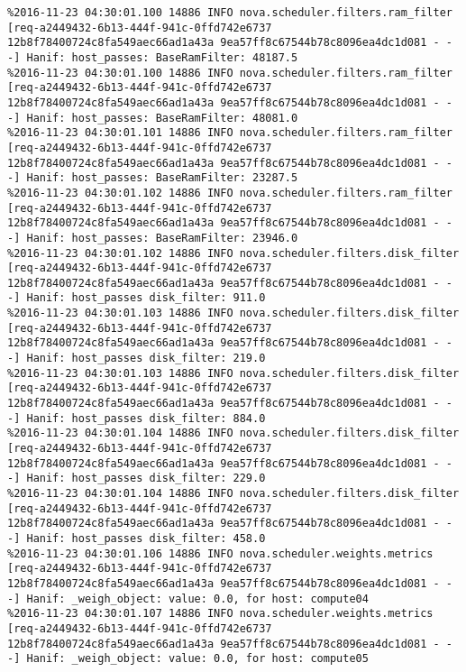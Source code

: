 \begin{lstlisting}[frame=single, caption={The filter scheduler log trace for 10 virtual instances}, label={lst:filterschedulercodetracelog10vi}, escapechar=|]
%2016-11-23 04:30:01.099 14886 INFO nova.scheduler.filters.ram_filter [req-a2449432-6b13-444f-941c-0ffd742e6737 12b8f78400724c8fa549aec66ad1a43a 9ea57ff8c67544b78c8096ea4dc1d081 - - -] Hanif: host_passes: BaseRamFilter: 11598.0
%2016-11-23 04:30:01.100 14886 INFO nova.scheduler.filters.ram_filter [req-a2449432-6b13-444f-941c-0ffd742e6737 12b8f78400724c8fa549aec66ad1a43a 9ea57ff8c67544b78c8096ea4dc1d081 - - -] Hanif: host_passes: BaseRamFilter: 48187.5
%2016-11-23 04:30:01.100 14886 INFO nova.scheduler.filters.ram_filter [req-a2449432-6b13-444f-941c-0ffd742e6737 12b8f78400724c8fa549aec66ad1a43a 9ea57ff8c67544b78c8096ea4dc1d081 - - -] Hanif: host_passes: BaseRamFilter: 48081.0
%2016-11-23 04:30:01.101 14886 INFO nova.scheduler.filters.ram_filter [req-a2449432-6b13-444f-941c-0ffd742e6737 12b8f78400724c8fa549aec66ad1a43a 9ea57ff8c67544b78c8096ea4dc1d081 - - -] Hanif: host_passes: BaseRamFilter: 23287.5
%2016-11-23 04:30:01.102 14886 INFO nova.scheduler.filters.ram_filter [req-a2449432-6b13-444f-941c-0ffd742e6737 12b8f78400724c8fa549aec66ad1a43a 9ea57ff8c67544b78c8096ea4dc1d081 - - -] Hanif: host_passes: BaseRamFilter: 23946.0
%2016-11-23 04:30:01.102 14886 INFO nova.scheduler.filters.disk_filter [req-a2449432-6b13-444f-941c-0ffd742e6737 12b8f78400724c8fa549aec66ad1a43a 9ea57ff8c67544b78c8096ea4dc1d081 - - -] Hanif: host_passes disk_filter: 911.0
%2016-11-23 04:30:01.103 14886 INFO nova.scheduler.filters.disk_filter [req-a2449432-6b13-444f-941c-0ffd742e6737 12b8f78400724c8fa549aec66ad1a43a 9ea57ff8c67544b78c8096ea4dc1d081 - - -] Hanif: host_passes disk_filter: 219.0
%2016-11-23 04:30:01.103 14886 INFO nova.scheduler.filters.disk_filter [req-a2449432-6b13-444f-941c-0ffd742e6737 12b8f78400724c8fa549aec66ad1a43a 9ea57ff8c67544b78c8096ea4dc1d081 - - -] Hanif: host_passes disk_filter: 884.0
%2016-11-23 04:30:01.104 14886 INFO nova.scheduler.filters.disk_filter [req-a2449432-6b13-444f-941c-0ffd742e6737 12b8f78400724c8fa549aec66ad1a43a 9ea57ff8c67544b78c8096ea4dc1d081 - - -] Hanif: host_passes disk_filter: 229.0
%2016-11-23 04:30:01.104 14886 INFO nova.scheduler.filters.disk_filter [req-a2449432-6b13-444f-941c-0ffd742e6737 12b8f78400724c8fa549aec66ad1a43a 9ea57ff8c67544b78c8096ea4dc1d081 - - -] Hanif: host_passes disk_filter: 458.0
%2016-11-23 04:30:01.106 14886 INFO nova.scheduler.weights.metrics [req-a2449432-6b13-444f-941c-0ffd742e6737 12b8f78400724c8fa549aec66ad1a43a 9ea57ff8c67544b78c8096ea4dc1d081 - - -] Hanif: _weigh_object: value: 0.0, for host: compute04
%2016-11-23 04:30:01.107 14886 INFO nova.scheduler.weights.metrics [req-a2449432-6b13-444f-941c-0ffd742e6737 12b8f78400724c8fa549aec66ad1a43a 9ea57ff8c67544b78c8096ea4dc1d081 - - -] Hanif: _weigh_object: value: 0.0, for host: compute05

\end{lstlisting}
